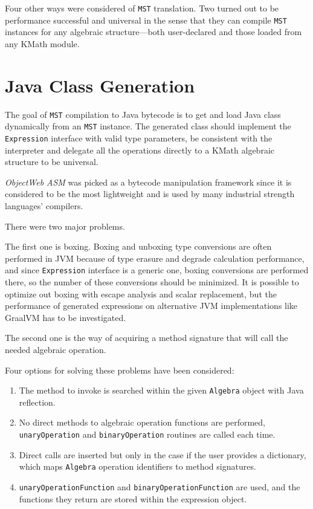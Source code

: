 \documentclass[conference]{IEEEtran}
\begin{document}
Four other ways were considered of \texttt{MST} translation. Two turned out to be performance successful and universal in the sense that they can compile \texttt{MST} instances for any algebraic structure---both user-declared and  those loaded from any KMath module.

\section{Java Class Generation}

The goal of \texttt{MST} compilation to Java bytecode is to get and load Java class dynamically from an \texttt{MST} instance. The generated class should implement the \texttt{Expression} interface with valid type parameters, be consistent with the interpreter and delegate all the operations directly to a KMath algebraic structure to be universal.

\textit{ObjectWeb ASM} \cite{ASM} was picked as a bytecode manipulation framework since it is considered to be the most lightweight and is used by many industrial strength languages' compilers.

There were two major problems.

The first one is boxing. Boxing and unboxing type conversions \cite{java11} are often performed in JVM because of type erasure and degrade calculation performance, and since \texttt{Expression} interface is a generic one, boxing conversions are performed there, so the number of these conversions should be minimized. It is possible to optimize out boxing with escape analysis and scalar replacement, but the performance of generated expressions on alternative JVM implementations like GraalVM \cite{GraalVM} has to be investigated.

The second one is the way of acquiring a method signature that will call the needed algebraic operation.

Four options for solving these problems have been considered:

\begin{enumerate}
    \item The method to invoke is searched within the given \texttt{Algebra} object with Java reflection.
    \item No direct methods to algebraic operation functions are performed, \texttt{unaryOperation} and \texttt{binaryOperation} routines are called each time.
    \item Direct calls are inserted but only in the case if the user provides a dictionary, which maps \texttt{Algebra} operation identifiers to method signatures.
    \item \texttt{unaryOperationFunction} and \texttt{binaryOperationFunction} are used, and the functions they return are stored within the expression object.
\end{enumerate}
\end{document}
